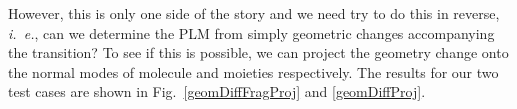 %






However, this is only one side of the story and we  need try to do this in reverse, {\em i.~e.}, can we
determine the PLM from simply geometric changes accompanying the transition? To see if this is possible,
we can project the geometry change onto the normal modes of molecule and moieties respectively.  The
results for our two test cases are shown  in Fig.~\ref{geomDiffFragProj} and \ref{geomDiffProj}.




